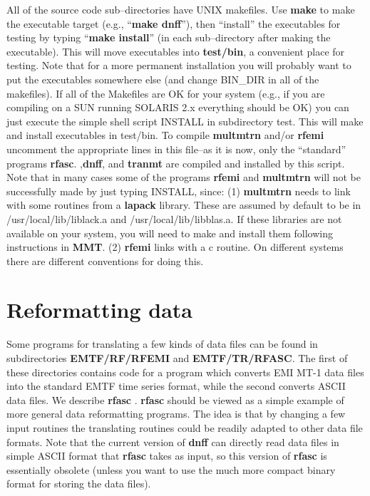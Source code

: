All of the source code sub--directories have UNIX makefiles.
Use {\bf make} to make the 
executable target (e.g., ``{\bf make dnff}''),
then ``install'' the executables for testing by typing
``{\bf make install}'' (in each sub--directory after making the executable).
This will move executables into {\bf test/bin}, a convenient
place for testing.  Note that
for a more permanent installation you will probably want to put 
the executables somewhere else (and change BIN\_DIR in all of the
makefiles).
If all of the Makefiles are OK for your system (e.g., if you are
compiling on a SUN running SOLARIS 2.x everything should be OK)
you can just execute the simple shell script INSTALL in subdirectory
test.  This will make and install executables in test/bin.
To compile {\bf multmtrn} and/or {\bf rfemi} uncomment the appropriate
lines in this file--as it is now, only the ``standard''
programs {\bf rfasc}. ,{\bf dnff}, and {\bf tranmt} are
compiled and installed by this script.
Note that in many cases some of the programs {\bf rfemi}
and {\bf multmtrn} will not be successfully made by
just typing INSTALL, since: (1) {\bf multmtrn} needs to link with 
some routines from a {\bf lapack} library.  These are assumed by
default to be in /usr/local/lib/liblack.a and /usr/local/lib/libblas.a.
If these libraries are not available on your system, you will need
to make and install them following instructions in {\bf MMT}.
(2) {\bf rfemi} links with a c routine.  On different systems there
are different conventions for doing this.

\section{Reformatting data}

Some programs for translating a few kinds of data files can
be found in subdirectories {\bf EMTF/RF/RFEMI} and {\bf EMTF/TR/RFASC}.
The first of these directories contains code for a program which
converts EMI MT-1 data files into the standard EMTF time series format,
while the second converts ASCII data files.  We describe {\bf rfasc} .
{\bf rfasc} should be viewed as a simple example of more general
data reformatting programs.  
The idea is that by changing a few input routines the translating
routines could be readily adapted to other data file formats. 
Note that the current version of {\bf dnff} can directly read data
files in simple ASCII format that {\bf rfasc} takes as input,
so this version of {\bf rfasc} is essentially obsolete
(unless you want to use the much more compact binary format for 
storing the data files).

